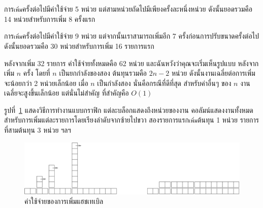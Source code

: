การ{\tt เพิ่ม}ครั้งต่อไปมีค่าใช้จ่าย 5 หน่วย แต่สามหน่วยถัดไปมีเพียงครั้งละหนึ่งหน่วย ดังนั้นยอดรวมคือ 14 หน่วยสำหรับการเพิ่ม 8 ครั้งแรก


การ{\tt เพิ่ม}ครั้งต่อไปมีค่าใช้จ่าย 9 หน่วย แต่จากนั้นเราสามารถเพิ่มอีก 7 ครั้งก่อนการปรับขนาดครั้งต่อไป ดังนั้นยอดรวมคือ 30 หน่วยสำหรับการเพิ่ม 16 รายการแรก

หลังจากเพิ่ม 32 รายการ ค่าใช้จ่ายทั้งหมดคือ 62 หน่วย และฉันหวังว่าคุณจะเริ่มเห็นรูปแบบ หลังจากเพิ่ม $n$ ครั้ง โดยที่ $n$ เป็นยกกำลังของสอง 
ต้นทุนรวมคือ $2n-2$ หน่วย ดังนั้นงานเฉลี่ยต่อการเพิ่มจะน้อยกว่า 2 หน่วยเล็กน้อย 
เมื่อ $n$ เป็นกำลังสอง นั่นคือกรณีที่ดีที่สุด สำหรับค่าอื่นๆ ของ $n$ งานเฉลี่ยจะสูงขึ้นเล็กน้อย แต่นั่นไม่สำคัญ ที่สำคัญคือ $O(1)$

รูปที่~\ref{fig.hash} แสดงวิธีการทำงานแบบกราฟิก แต่ละบล็อกแสดงถึงหน่วยของงาน 
คอลัมน์แสดงงานทั้งหมดสำหรับการเพิ่มแต่ละรายการโดยเรียงลำดับจากซ้ายไปขวา 
สองรายการแรก{\tt เพิ่ม}ต้นทุน 1 หน่วย รายการที่สามต้นทุน 3 หน่วย ฯลฯ

\begin{figure}
\centerline{\includegraphics[width=5.5in]{figs/towers.pdf}}
\caption{ค่าใช้จ่ายของการเพิ่มแฮชเทเบิล\label{fig.hash}}
\end{figure}

